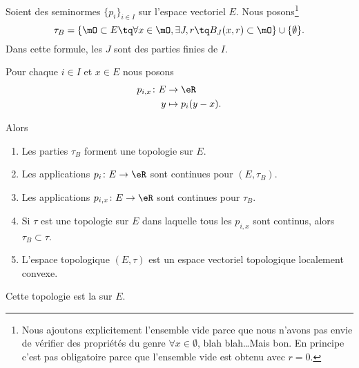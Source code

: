 \begin{propositionDef}      \label{DEFooZTKAooWYUyDa}
	Soient des seminormes \( \{ p_i \}_{i\in I}\) sur l'espace vectoriel \( E\). Nous posons\footnote{Nous ajoutons explicitement l'ensemble vide parce que nous n'avons pas envie de vérifier des propriétés du genre \( \forall x\in\emptyset\), blah blah\ldots Mais bon. En principe c'est pas obligatoire parce que l'ensemble vide est obtenu avec \( r=0\).}
	\begin{equation}
		\tau_B=\{ \mO\subset E\tq \forall x\in\mO, \exists J,r\tq B_J(x,r)\subset \mO \}\cup\{ \emptyset \}.
	\end{equation}
	Dans cette formule, les \( J\) sont des parties finies de \( I\).

	Pour chaque \( i\in I\) et \( x\in E\) nous posons
	\begin{equation}
		\begin{aligned}
			p_{i,x}\colon E & \to \eR           \\
			y               & \mapsto p_i(y-x).
		\end{aligned}
	\end{equation}

	Alors
	\begin{enumerate}
		\item		\label{ITEMooQPVRooKyOBPi}
		      Les parties \( \tau_B\) forment une topologie sur \( E\).
		\item \label{ITEMooQIYWooAmPCdI}
		      Les applications \(p_i \colon E\to \eR  \) sont continues pour \( (E,\tau_B)\).
		\item		\label{ITEMooYGNWooYhBzSa}
		      Les applications \( p_{i,x} \colon E\to \eR  \) sont continues pour \( \tau_B\).
		\item		\label{ITEMooMUUZooBKBhsH}
		      Si \( \tau\) est une topologie sur \( E\) dans laquelle tous les \( p_{i,x}\) sont continus, alors \( \tau_B\subset\tau\).
		\item		\label{ITEMooEGVFooNqDkdN}
		      L'espace topologique \( (E,\tau)\) est un espace vectoriel topologique localement convexe.
	\end{enumerate}

	Cette topologie est la  sur \( E\).
\end{propositionDef}

